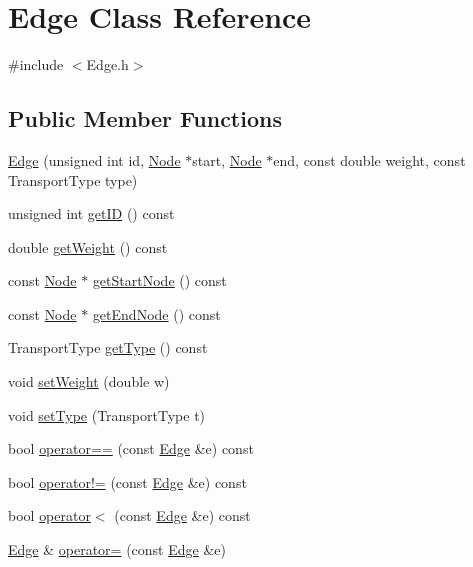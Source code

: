 \hypertarget{classEdge}{\section{Edge Class Reference}
\label{classEdge}
}


{\ttfamily \#include $<$Edge.\+h$>$}

\subsection*{Public Member Functions}
\begin{DoxyCompactItemize}
\item 
\hyperlink{classEdge_a8f25ebc010f7bd477335f905643d34bf}{Edge} (unsigned int id, \hyperlink{classNode}{Node} $\ast$start, \hyperlink{classNode}{Node} $\ast$end, const double weight, const Transport\+Type type)
\item 
unsigned int \hyperlink{classEdge_ab14a1f1e26da641effaa7af1e36bd410}{get\+I\+D} () const 
\item 
double \hyperlink{classEdge_ad52d5996050993b96b0b04d68f14f4e4}{get\+Weight} () const 
\item 
const \hyperlink{classNode}{Node} $\ast$ \hyperlink{classEdge_a88540e6c5ab8ad2aa4343a8f21339707}{get\+Start\+Node} () const 
\item 
const \hyperlink{classNode}{Node} $\ast$ \hyperlink{classEdge_abeb6634d35c7c5c1706bc90d91b12c37}{get\+End\+Node} () const 
\item 
Transport\+Type \hyperlink{classEdge_aa38a79bf1da5e02ebd57292c73bfd5fa}{get\+Type} () const 
\item 
void \hyperlink{classEdge_a7ba1bfa5c9c7972d2c31b2c3ba3d7c69}{set\+Weight} (double w)
\item 
void \hyperlink{classEdge_a6fd6d3fd58d73f04b763e2a5bfa6e7e0}{set\+Type} (Transport\+Type t)
\item 
bool \hyperlink{classEdge_a5e15d0508aa070e0dfb9d8b63f1fd510}{operator==} (const \hyperlink{classEdge}{Edge} \&e) const 
\item 
bool \hyperlink{classEdge_a71932326f1787effb05a27254ec354f4}{operator!=} (const \hyperlink{classEdge}{Edge} \&e) const 
\item 
bool \hyperlink{classEdge_a2dd271913eaa0f6250d764170055a3e9}{operator$<$} (const \hyperlink{classEdge}{Edge} \&e) const 
\item 
\hyperlink{classEdge}{Edge} \& \hyperlink{classEdge_ad61a4407d09b063f1d36827cdaa8cfa7}{operator=} (const \hyperlink{classEdge}{Edge} \&e)
\end{DoxyCompactItemize}

